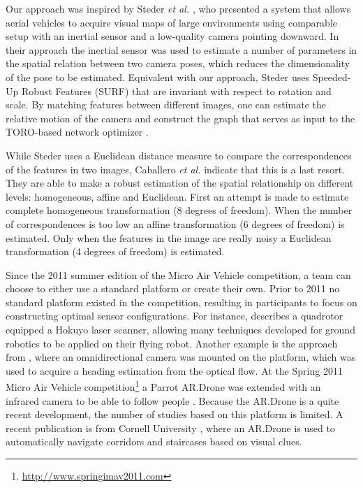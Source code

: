 Our approach was inspired by Steder \textit{et al.} \cite{steder2008visual}, who  presented a system that allows aerial vehicles to acquire visual maps of large environments using comparable setup with an inertial sensor and a low-quality camera pointing downward. In their approach the inertial sensor was used to estimate a number of parameters in the spatial relation between two camera poses, which reduces the dimensionality of the pose to be estimated.
Equivalent with our approach, Steder uses Speeded-Up Robust Features (SURF) \cite{Bay2008cviu} that are invariant with respect to rotation and scale.
By matching features between different images, one can estimate the relative motion of the camera and construct the graph that serves as input to the TORO-based network optimizer \cite{Grisetti2007iros}.

While Steder uses a Euclidean distance measure to compare the correspondences of the features in two images, Caballero \textit{et al.} \cite{caballero2009unmanned} indicate that this is a last resort. They are able to make a robust estimation of the spatial relationship on different levels: homogeneous, affine and Euclidean. First an attempt is made to estimate complete homogeneous transformation (8 degrees of freedom). When the number of correspondences is too low an affine transformation (6 degrees of freedom) is estimated. Only when the features in the image are really noisy a Euclidean transformation (4 degrees of freedom) is estimated.

Since the 2011 summer edition of the Micro Air Vehicle competition, a team can choose to either use a standard platform or create their own.
Prior to 2011 no standard platform existed in the competition, resulting in participants to focus on constructing optimal sensor configurations.
For instance, \cite{Bachrach2009ijmav} describes a quadrotor equipped a Hokuyo laser scanner, allowing many techniques developed for ground robotics to be applied on their flying robot.
Another example is the approach from \cite{Stowers2009ijmav}, where an omnidirectional camera was mounted on the platform, which was used to acquire a heading estimation from the optical flow.
At the %
Spring 2011 Micro Air Vehicle competition\footnote{\url{http://www.springimav2011.com}} a Parrot AR.Drone was extended with an infrared camera to be able to follow people \cite{Jonanov2011}. Because the AR.Drone is a quite recent development, the number of studies based on this platform is limited. A recent publication is from Cornell University \cite{Bills2011icra}, where an AR.Drone is used to automatically navigate corridors and staircases based on visual clues.

